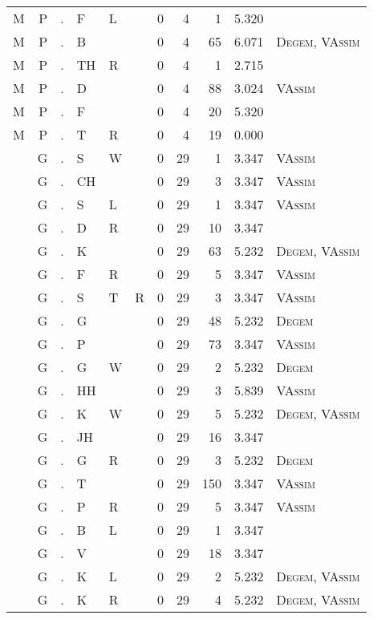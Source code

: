 \begin{longtable}{r@{ } r@{ } c@{ } l@{ } l@{ } l@{ } r r r r l }
M & P & . & F & L &  & 0 & 4 & 1 & 5.320 &  \\
M & P & . & B &  &  & 0 & 4 & 65 & 6.071 & \textsc{Degem}, \textsc{VAssim} \\
M & P & . & TH & R &  & 0 & 4 & 1 & 2.715 &  \\
M & P & . & D &  &  & 0 & 4 & 88 & 3.024 & \textsc{VAssim} \\
M & P & . & F &  &  & 0 & 4 & 20 & 5.320 &  \\
M & P & . & T & R &  & 0 & 4 & 19 & 0.000 &  \\
 & G & . & S & W &  & 0 & 29 & 1 & 3.347 & \textsc{VAssim} \\
 & G & . & CH &  &  & 0 & 29 & 3 & 3.347 & \textsc{VAssim} \\
 & G & . & S & L &  & 0 & 29 & 1 & 3.347 & \textsc{VAssim} \\
 & G & . & D & R &  & 0 & 29 & 10 & 3.347 &  \\
 & G & . & K &  &  & 0 & 29 & 63 & 5.232 & \textsc{Degem}, \textsc{VAssim} \\
 & G & . & F & R &  & 0 & 29 & 5 & 3.347 & \textsc{VAssim} \\
 & G & . & S & T & R & 0 & 29 & 3 & 3.347 & \textsc{VAssim} \\
 & G & . & G &  &  & 0 & 29 & 48 & 5.232 & \textsc{Degem} \\
 & G & . & P &  &  & 0 & 29 & 73 & 3.347 & \textsc{VAssim} \\
 & G & . & G & W &  & 0 & 29 & 2 & 5.232 & \textsc{Degem} \\
 & G & . & HH &  &  & 0 & 29 & 3 & 5.839 & \textsc{VAssim} \\
 & G & . & K & W &  & 0 & 29 & 5 & 5.232 & \textsc{Degem}, \textsc{VAssim} \\
 & G & . & JH &  &  & 0 & 29 & 16 & 3.347 &  \\
 & G & . & G & R &  & 0 & 29 & 3 & 5.232 & \textsc{Degem} \\
 & G & . & T &  &  & 0 & 29 & 150 & 3.347 & \textsc{VAssim} \\
 & G & . & P & R &  & 0 & 29 & 5 & 3.347 & \textsc{VAssim} \\
 & G & . & B & L &  & 0 & 29 & 1 & 3.347 &  \\
 & G & . & V &  &  & 0 & 29 & 18 & 3.347 &  \\
 & G & . & K & L &  & 0 & 29 & 2 & 5.232 & \textsc{Degem}, \textsc{VAssim} \\
 & G & . & K & R &  & 0 & 29 & 4 & 5.232 & \textsc{Degem}, \textsc{VAssim} \\

\end{longtable}
